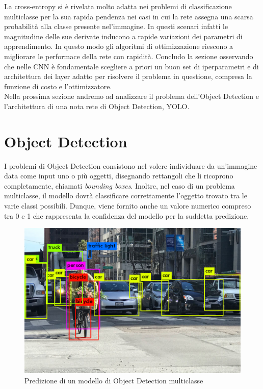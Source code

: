 \documentclass[12pt,a4paper,openright,twoside]{report}
\begin{document}
La cross-entropy si è rivelata molto adatta nei problemi di classificazione multiclasse per la sua rapida pendenza nei casi in cui la rete assegna una scarsa probabilità alla classe presente nel'immagine. In questi scenari infatti le magnitudine delle sue derivate inducono a rapide variazioni dei parametri di apprendimento. In questo modo gli algoritmi di ottimizzazione riescono a migliorare le performace della rete con rapidità.
\newpage
Concludo la sezione osservando che nelle CNN è fondamentale scegliere a priori un buon set di iperparametri e di architettura dei layer adatto per risolvere il problema in questione, compresa la funzione di costo e l'ottimizzatore. \\

Nella prossima sezione andremo ad analizzare il problema dell'Object Detection e l'architettura di una nota rete di Object Detection, YOLO.
\newpage
\section{Object Detection}
I problemi di Object Detection consistono nel volere individuare da un'immagine data come input uno o più oggetti, disegnando rettangoli che li ricoprono completamente, chiamati \emph{bounding boxes}. Inoltre, nel caso di un problema multiclasse, il modello dovrà classificare correttamente l'oggetto trovato tra le varie classi possibili. Dunque, viene fornito anche un valore numerico compreso tra 0 e 1 che rappresenta la confidenza del modello per la suddetta predizione.
\begin{figure}[h]
\centering
\includegraphics[width=\linewidth]{object_detection.png}
\caption{Predizione di un modello di Object Detection multiclasse}
\end{figure}
\end{document}
